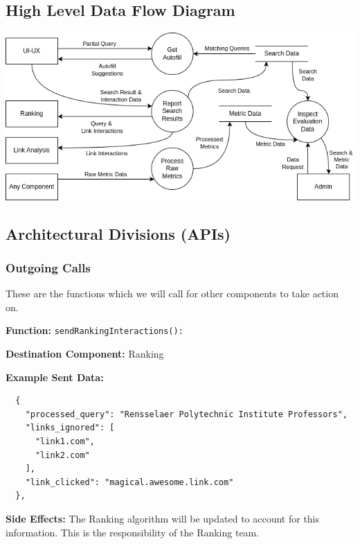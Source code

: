 \subsection*{High Level Data Flow Diagram}

\begin{center}
  \includegraphics[scale=0.65]{DFDs/HighLevelDFD.drawio.png}
\end{center}

\newpage
\subsection*{Architectural Divisions (APIs)}

\subsubsection*{Outgoing Calls}
These are the functions which we will call for other components to take action on.

\medskip

\textbf{Function:} \verb|sendRankingInteractions():|

\smallskip

\textbf{Destination Component:} Ranking

\smallskip

\textbf{Example Sent Data:} \begin{verbatim}
  {
    "processed_query": "Rensselaer Polytechnic Institute Professors",
    "links_ignored": [
      "link1.com",
      "link2.com"
    ],
    "link_clicked": "magical.awesome.link.com"
  },
\end{verbatim}

\smallskip

\textbf{Side Effects:} The Ranking algorithm will be updated to account for this information. This is the responsibility of the Ranking team.

\bigskip


